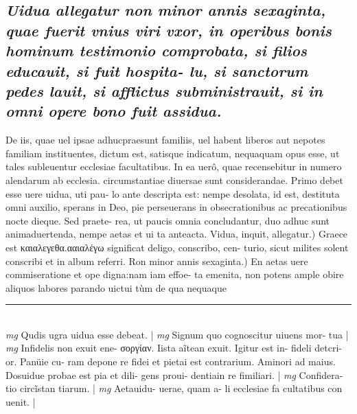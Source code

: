 \documentclass{article}
\begin{document}
\begin{pages}
\subsection*{\textit{Uidua allegatur non minor annis sexaginta, quae fuerit vnius viri vxor, in operibus bonis hominum testimonio comprobata, si filios educauit, si fuit hospita- lu, si sanctorum pedes lauit, si afflictus subministrauit, si in omni opere bono fuit assidua. }}\pstart De iis, quae uel ipsae adhucpraesunt familiis, uel habent liberos aut nepotes familiam instituentes, dictum est, satisque indicatum, nequaquam opus esse, ut tales subleuentur ecclesiae facultatibus. In ea uerô, quae recensebitur in numero alendarum ab ecclesia. circumstantiae diuersae sunt considerandae. Primo debet esse uere uidua, uti pau- lo ante descripta est: nempe desolata, id est, destituta omni auxilio, sperans in Deo, pie perseuerans in obsecrationibus ac precationibus nocte dieque. Sed praete- rea, ut paucis omnia concludantur, duo adhuc sunt animaduertenda, nempe aetas et ui ta anteacta.  \pend\pstart Vidua, inquit, allegatur.) Graece est καιαλεγεθα.ααιαλέγω significat deligo, conscribo, cen- turio, sicut milites solent conscribi et in album referri.  \pend\pstart Ron minor annis sexaginta.) En aetas uere commiseratione et ope digna:nam iam effoe- ta emenita, non potens ample obire aliquos labores parando uictui tùm de qua nequaque   \pend
\vspace{0.5cm}\noindent
\vspace{0.2cm}\rule{1cm}{0.2pt}\\ 
\hspace{0.2cm}\textit{mg}
\footnotesize Qudis ugra uidua esse debeat. 
\normalsize| 
\hspace{0.2cm}\textit{mg}
\footnotesize Signum quo cognoscitur uiuens mor- tua 
\normalsize| 
\hspace{0.2cm}\textit{mg}
\footnotesize Infidelis non exuit ene- σοργίαν. Iista aĩtean exuit. Igitur est in- fideli detcri- or. Panüie cu- ram depone re fidei et pietai est contrarium. Aminori ad maius. Dosuidue probae est pia et dili- gens proui- dentiain re fimiliari. 
\normalsize| 
\hspace{0.2cm}\textit{mg}
\footnotesize Confidera- tio circĩstan tiarum. 
\normalsize| 
\hspace{0.2cm}\textit{mg}
\footnotesize Aetauidu- uerae, quam a- li ecclesiae fa cultatibus con uenit. 
\normalsize| 

\end{pages}
\end{document}
